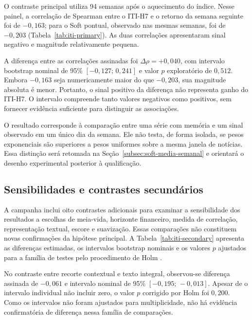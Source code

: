 O contraste principal utiliza 94 semanas após o aquecimento do índice. Nesse painel, a correlação de Spearman entre o ITI-H7 e o retorno da semana seguinte foi de $-0{,}163$; para o Soft pontual, observado nas mesmas semanas, foi de $-0{,}203$ (Tabela~\ref{tab:iti-primary}). As duas correlações apresentaram sinal negativo e magnitude relativamente pequena.



A diferença entre as correlações assinadas foi $\Delta\rho=+0{,}040$, com intervalo bootstrap nominal de 95\% $[-0{,}127;\,0{,}241]$ e valor $p$ exploratório de $0{,}512$. Embora $-0{,}163$ seja numericamente maior do que $-0{,}203$, sua magnitude absoluta é menor. Portanto, o sinal positivo da diferença não representa ganho do ITI-H7. O intervalo compreende tanto valores negativos como positivos, sem fornecer evidência suficiente para distinguir as associações.

O resultado corresponde à comparação entre uma série com memória e um sinal observado em um único dia da semana. Ele não testa, de forma isolada, se pesos exponenciais são superiores a pesos uniformes sobre a mesma janela de notícias. Essa distinção será retomada na Seção~\ref{subsec:soft-media-semanal} e orientará o desenho experimental posterior à qualificação.

\subsection{Sensibilidades e contrastes secundários}

A campanha inclui oito contrastes adicionais para examinar a sensibilidade dos resultados a escolhas de meia-vida, horizonte financeiro, medida de correlação, representação textual, escore e suavização. Essas comparações não constituem novas confirmações da hipótese principal. A Tabela~\ref{tab:iti-secondary} apresenta as diferenças estimadas, os intervalos bootstrap nominais e os valores $p$ ajustados para a família de testes pelo procedimento de Holm \cite{holm1979multiple}.



No contraste entre recorte contextual e texto integral, observou-se diferença assinada de $-0{,}061$ e intervalo nominal de 95\% $[-0{,}195;\,-0{,}013]$. Apesar de o intervalo individual não incluir zero, o valor $p$ corrigido por Holm foi $0{,}200$. Como os intervalos não foram ajustados para multiplicidade, não há evidência confirmatória de diferença nessa família de comparações.

